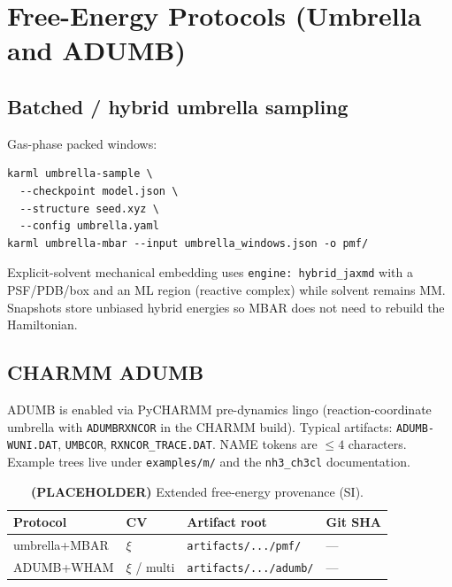 \documentclass[journal=jctc,manuscript=article]{achemso}
\begin{document}
\section{Free-Energy Protocols (Umbrella and ADUMB)}
\label{si:free-energy}

\subsection{Batched / hybrid umbrella sampling}

Gas-phase packed windows:
\begin{verbatim}
karml umbrella-sample \
  --checkpoint model.json \
  --structure seed.xyz \
  --config umbrella.yaml
karml umbrella-mbar --input umbrella_windows.json -o pmf/
\end{verbatim}
Explicit-solvent mechanical embedding uses \texttt{engine: hybrid\_jaxmd} with a
PSF/PDB/box and an ML region (reactive complex) while solvent remains MM.
Snapshots store unbiased hybrid energies so MBAR does not need to rebuild the
Hamiltonian.

\subsection{CHARMM ADUMB}

ADUMB is enabled via PyCHARMM pre-dynamics lingo (reaction-coordinate umbrella
with \texttt{ADUMBRXNCOR} in the CHARMM build). Typical artifacts:
\texttt{ADUMB-WUNI.DAT}, \texttt{UMBCOR}, \texttt{RXNCOR\_TRACE.DAT}. NAME tokens
are \(\le 4\) characters. Example trees live under \texttt{examples/m/} and the
\texttt{nh3\_ch3cl} documentation.

\begin{table}[h]
\caption{\textbf{(PLACEHOLDER)} Extended free-energy provenance (SI).}
\label{tab:si-fe}
\begin{tabular}{llll}
\toprule
Protocol & CV & Artifact root & Git SHA \\
\midrule
umbrella+MBAR & \(\xi\) & \texttt{artifacts/.../pmf/} & --- \\
ADUMB+WHAM & \(\xi\) / multi & \texttt{artifacts/.../adumb/} & --- \\
\bottomrule
\end{tabular}
\end{table}

\end{document}
